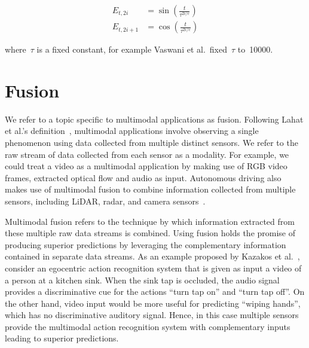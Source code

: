 \begin{equation}
\begin{split}
E_{t, 2i} &= \sin\left(\frac{t}{\tau^{2i/c}}\right) \\
E_{t, 2i + 1} &= \cos\left(\frac{t}{\tau^{2i/c}}\right)
\end{split}
\end{equation}

\noindent where~$\tau$ is a fixed constant, for example Vaswani et al.\ fixed~$\tau$
to~\num{10000}.






\section{Fusion}

We refer to a topic specific to multimodal applications as fusion.
Following Lahat et al.'s definition~\cite{Lahat2015MultimodalDF}, multimodal
applications involve observing a single phenomenon using data collected from
multiple distinct sensors.
We refer to the raw stream of data collected from each sensor as a modality.
For example, we could treat a video as a multimodal application by making use
of RGB video frames, extracted optical flow and audio as input.
Autonomous driving also makes use of multimodal fusion to combine information
collected from multiple sensors, including LiDAR, radar, and camera
sensors~\cite{Feng2019DeepMO}.

Multimodal fusion refers to the technique by which information extracted from
these multiple raw data streams is combined.
Using fusion holds the promise of producing superior predictions by leveraging
the complementary information contained in separate data streams.
As an example proposed by Kazakos et al.~\cite{kazakos2019TBN}, consider an
egocentric action recognition system that is given as input a video of a person
at a kitchen sink.
When the sink tap is occluded, the audio signal provides a discriminative cue
for the actions ``turn tap on'' and ``turn tap off''.
On the other hand, video input would be more useful for predicting ``wiping
hands'', which has no discriminative auditory signal.
Hence, in this case multiple sensors provide the multimodal action recognition
system with complementary inputs leading to superior predictions.

